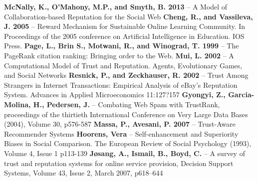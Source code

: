 \documentclass[]{final_report}
\begin{document}
\newpage
\raggedright
\textbf{McNally, K., O'Mahony, M.P., and Smyth, B. 2013} -- A Model of Collaboration-based Reputation for the Social Web
\linebreak
\linebreak
\textbf{Cheng, R., and Vassileva, J. 2005} -- Reward Mechanism for Sustainable Online Learning Community. In Proceedings of the 2005 conference on Artificial Intelligence in Education. IOS Press.
\linebreak
\linebreak
\textbf{Page, L., Brin S., Motwani, R., and Winograd, T. 1999} -- The PageRank citation ranking: Bringing order to the Web.
\linebreak
\linebreak
\textbf{Mui, L. 2002} -- A Computational Model of Trust and Reputation. Agents, Evolutionary Games, and Social Networks
\linebreak
\linebreak
\textbf{Resnick, P., and Zeckhauser, R. 2002} -- Trust Among Strangers in Internet Transactions: Empirical Analysis of eBay's Reputation System. Advances in Applied Microeconomics 11:127?157
\linebreak
\linebreak
\textbf{Gyongyi, Z., Garcia-Molina, H., Pedersen, J.} -- Combating Web Spam with TrustRank, proceedings of the thirtieth International Conference on Very Large Data Bases (2004), Volume 30, p576-587
\linebreak
\linebreak
\textbf{Massa, P., Avesani, P. 2007} -- Trust-Aware Recommender Systems
\linebreak
\linebreak
\textbf{Hoorens, Vera} -- Self-enhancement and Superiority Biases in Social Comparison. The European Review of Social Psychology (1993), Volume 4, Issue 1 p113-139
\linebreak
\linebreak
\textbf{Jøsang, A., Ismail, B., Boyd, C.} -- A survey of trust and reputation systems for online service provision, Decision Support Systems, Volume 43, Issue 2, March 2007, p618–644



\label{endpage}
\end{document}
